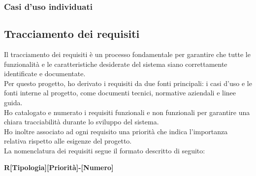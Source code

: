 

\pagebreak
\subsubsection{Casi d'uso individuati}
\label{subsubsec:casi-uso-individuati}



\subsection{Tracciamento dei requisiti}
\label{subsec:requisiti}

Il tracciamento dei requisiti è un processo fondamentale per garantire che tutte le funzionalità e le caratteristiche desiderate del sistema siano correttamente identificate e documentate. \\
Per questo progetto, ho derivato i requisiti da due fonti principali: i casi d'uso e le fonti interne al progetto, come documenti tecnici, normative aziendali e linee guida.\\ 

\noindent Ho catalogato e numerato i requisiti funzionali e non funzionali per garantire una chiara tracciabilità durante lo sviluppo del sistema.\\
Ho inoltre associato ad ogni requisito una priorità che indica l'importanza relativa rispetto alle esigenze del progetto.\\

\noindent La nomenclatura dei requisiti segue il formato descritto di seguito:

\begin{center}
\textbf{R[Tipologia][Priorità]-[Numero]}
\end{center}


